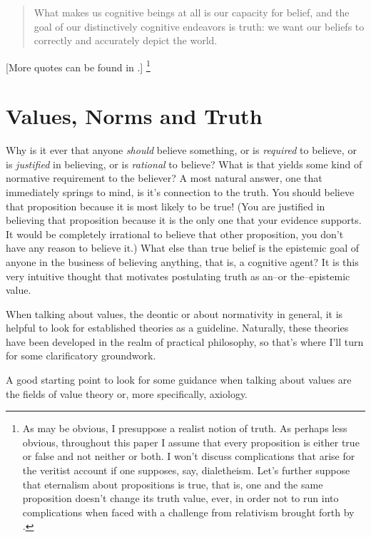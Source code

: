 \documentclass[12pt,numbers=noenddot]{scrartcl}
\begin{document}
\begin{quote}
What makes us cognitive beings at all is our capacity for belief, and the goal of our distinctively cognitive endeavors is truth: we want our beliefs to correctly and accurately depict the world. \textcite[7]{Bonjour1985}
\end{quote}

[More quotes can be found in \textcite{Goldman2002-GOLTUO-2}.]
\footnote{As may be obvious, I presuppose a realist notion of truth. As perhaps less obvious, throughout this paper I assume that every proposition is either true or false and not neither or both. I won't discuss complications that arise for the veritist account if one supposes, say, dialetheism. Let's further suppose that eternalism about propositions is true, that is, one and the same proposition doesn't change its truth value, ever, in order not to run into complications when faced with a challenge from relativism brought forth by \textcite{Brogaard2008-BROTTA-3}.}

\section{Values, Norms and Truth}\label{sec:values}

Why is it ever that anyone \emph{should} believe something, or is \emph{required} to believe, or is \emph{justified} in believing, or is \emph{rational} to believe? What is that yields some kind of normative requirement to the believer? A most natural answer, one that immediately springs to mind, is it's connection to the truth. You should believe that proposition because it is most likely to be true! (You are justified in believing that proposition because it is the only one that your evidence supports. It would be completely irrational to believe that other proposition, you don't have any reason to believe it.) What else than true belief is the epistemic goal of anyone in the business of believing anything, that is, a cognitive agent? It is this very intuitive thought that motivates postulating truth as an–or the–epistemic value.

When talking about values, the deontic or about normativity in general, it is helpful to look for established theories as a guideline. Naturally, these theories have been developed in the realm of practical philosophy, so that's where I'll turn for some clarificatory groundwork.

A good starting point to look for some guidance when talking about values are the fields of value theory or, more specifically, axiology.
\end{document}
